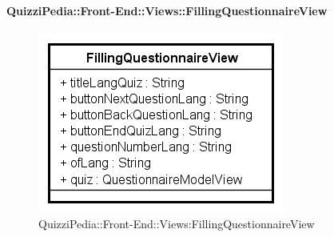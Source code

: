 \paragraph{QuizziPedia::Front-End::Views::FillingQuestionnaireView}
\begin{figure} [ht]
	\centering
	\includegraphics[scale=0.80]{UML/Classi/Front-End/QuizziPedia_Front-end_Views_FillingQuestionnaireView.png}
	\caption{QuizziPedia::Front-End::Views:FillingQuestionnaireView}
\end{figure} \FloatBarrier
